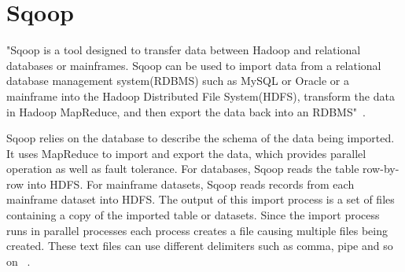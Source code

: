 \section{Sqoop}

"Sqoop is a tool designed to transfer data between Hadoop and 
relational databases or mainframes. Sqoop can be used to import 
data from a relational database management system(RDBMS) such 
as MySQL or Oracle or a mainframe into the Hadoop Distributed 
File System(HDFS), transform the data in Hadoop MapReduce, and 
then export the data back into an RDBMS"~\cite{hid-sp18-517-Sqoop}.

Sqoop relies on the database to describe the schema of the data 
being imported. It uses MapReduce to import and export the data, 
which provides parallel operation as well as fault tolerance. 
For databases, Sqoop reads the table row-by-row into HDFS. 
For mainframe datasets, Sqoop reads records from each mainframe 
dataset into HDFS. The output of this import process is a set of 
files containing a copy of the imported table or datasets. Since 
the import process runs in parallel processes each process 
creates a file causing multiple files being created. These text 
files can use different delimiters such as comma, pipe and so on 
~\cite{hid-sp18-517-Sqoop}.


